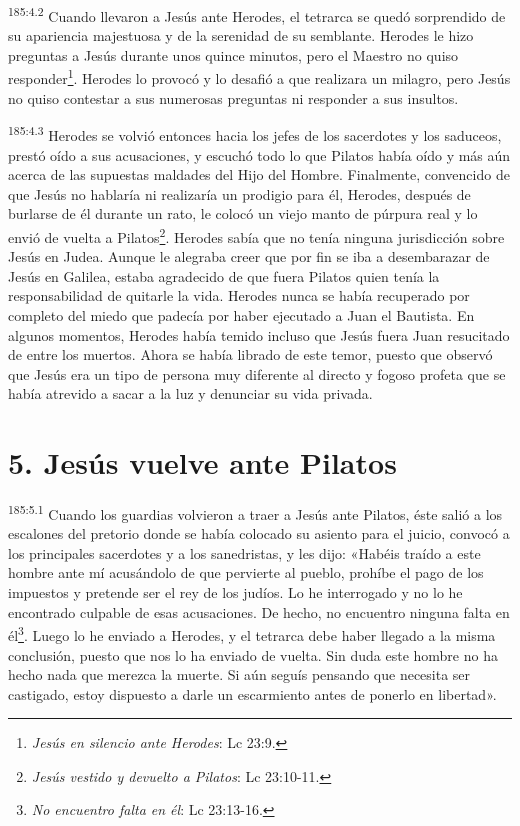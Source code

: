 \par
\textsuperscript{185:4.2} Cuando llevaron a Jesús ante Herodes, el tetrarca se quedó sorprendido de su apariencia majestuosa y de la serenidad de su semblante. Herodes le hizo preguntas a Jesús durante unos quince minutos, pero el Maestro no quiso responder\footnote{\textit{Jesús en silencio ante Herodes}: Lc 23:9.}. Herodes lo provocó y lo desafió a que realizara un milagro, pero Jesús no quiso contestar a sus numerosas preguntas ni responder a sus insultos.

\par
\textsuperscript{185:4.3} Herodes se volvió entonces hacia los jefes de los sacerdotes y los saduceos, prestó oído a sus acusaciones, y escuchó todo lo que Pilatos había oído y más aún acerca de las supuestas maldades del Hijo del Hombre. Finalmente, convencido de que Jesús no hablaría ni realizaría un prodigio para él, Herodes, después de burlarse de él durante un rato, le colocó un viejo manto de púrpura real y lo envió de vuelta a Pilatos\footnote{\textit{Jesús vestido y devuelto a Pilatos}: Lc 23:10-11.}. Herodes sabía que no tenía ninguna jurisdicción sobre Jesús en Judea. Aunque le alegraba creer que por fin se iba a desembarazar de Jesús en Galilea, estaba agradecido de que fuera Pilatos quien tenía la responsabilidad de quitarle la vida. Herodes nunca se había recuperado por completo del miedo que padecía por haber ejecutado a Juan el Bautista. En algunos momentos, Herodes había temido incluso que Jesús fuera Juan resucitado de entre los muertos. Ahora se había librado de este temor, puesto que observó que Jesús era un tipo de persona muy diferente al directo y fogoso profeta que se había atrevido a sacar a la luz y denunciar su vida privada.

\section*{5. Jesús vuelve ante Pilatos}
\par
\textsuperscript{185:5.1} Cuando los guardias volvieron a traer a Jesús ante Pilatos, éste salió a los escalones del pretorio donde se había colocado su asiento para el juicio, convocó a los principales sacerdotes y a los sanedristas, y les dijo: «Habéis traído a este hombre ante mí acusándolo de que pervierte al pueblo, prohíbe el pago de los impuestos y pretende ser el rey de los judíos. Lo he interrogado y no lo he encontrado culpable de esas acusaciones. De hecho, no encuentro ninguna falta en él\footnote{\textit{No encuentro falta en él}: Lc 23:13-16.}. Luego lo he enviado a Herodes, y el tetrarca debe haber llegado a la misma conclusión, puesto que nos lo ha enviado de vuelta. Sin duda este hombre no ha hecho nada que merezca la muerte. Si aún seguís pensando que necesita ser castigado, estoy dispuesto a darle un escarmiento antes de ponerlo en libertad».


